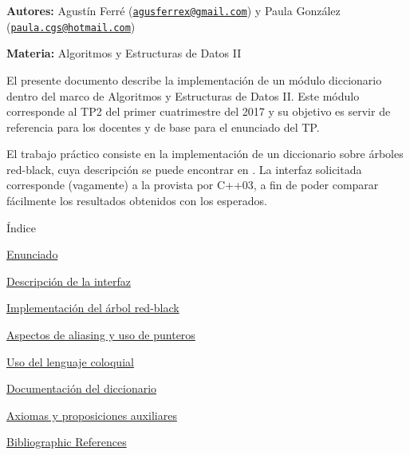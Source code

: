 
\begin{DoxyItemize}
\item {\bfseries \-Autores\-:} \-Agustín \-Ferré (\href{mailto:agusferrex@gmail.com}{\tt agusferrex@gmail.\-com}) y \-Paula \-González (\href{mailto:paula.cgs@hotmail.com}{\tt paula.\-cgs@hotmail.\-com})
\item {\bfseries \-Materia\-:} \-Algoritmos y \-Estructuras de \-Datos \-I\-I
\end{DoxyItemize}

\-El presente documento describe la implementación de un módulo diccionario dentro del marco de \-Algoritmos y \-Estructuras de \-Datos \-I\-I. \-Este módulo corresponde al \-T\-P2 del primer cuatrimestre del 2017 y su objetivo es servir de referencia para los docentes y de base para el enunciado del \-T\-P.

\-El trabajo práctico consiste en la implementación de un diccionario sobre árboles red-\/black, cuya descripción se puede encontrar en \cite{CormenLeisersonRivestStein2009}. \-La interfaz solicitada corresponde (vagamente) a la provista por \-C++03, a fin de poder comparar fácilmente los resultados obtenidos con los esperados.

\begin{DoxyParagraph}{Índice}

\end{DoxyParagraph}

\begin{DoxyItemize}
\item \hyperlink{Enunciado}{\-Enunciado}
\item \hyperlink{Interfaz}{\-Descripción de la interfaz}
\item \hyperlink{Implementacion}{\-Implementación del árbol red-\/black}
\item \hyperlink{Aliasing}{\-Aspectos de aliasing y uso de punteros}
\item \hyperlink{Castellano}{\-Uso del lenguaje coloquial}
\item \hyperlink{classaed2_1_1map}{\-Documentación del diccionario }
\item \hyperlink{axiomas}{\-Axiomas y proposiciones auxiliares}
\item \hyperlink{citelist}{\-Bibliographic \-References} 
\end{DoxyItemize}